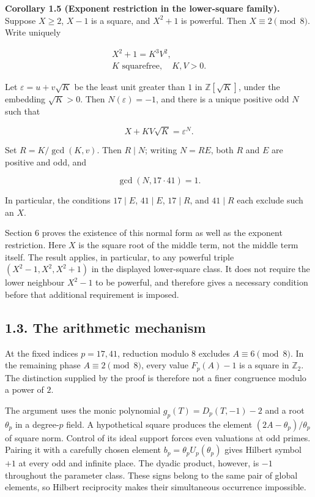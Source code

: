 \documentclass[11pt,a4paper]{article}
\begin{document}
\protect{}\label{cor-source}
\textbf{Corollary 1.5 (Exponent restriction in the lower-square
family).} Suppose \(X\ge2\), \(X-1\) is a square, and \(X^2+1\) is
powerful. Then \(X\equiv2\pmod8\). Write uniquely

\[
\begin{gathered}
X^2+1=K^3V^2,\\
K\text{ squarefree},\quad K,V>0.
\end{gathered}
\tag{1.7}
\]

Let \(\varepsilon=u+v\sqrt K\) be the least unit greater than \(1\) in
\(\mathbb Z[\sqrt K]\), under the embedding \(\sqrt K>0\). Then
\(N(\varepsilon)=-1\), and there is a unique positive odd \(N\) such
that

\[
X+KV\sqrt K=\varepsilon^N.
\tag{1.8}
\]

Set \(R=K/\gcd(K,v)\). Then \(R\mid N\); writing \(N=RE\), both \(R\)
and \(E\) are positive and odd, and

\[
\gcd(N,17\cdot41)=1.
\tag{1.9}
\]

In particular, the conditions \(17\mid E\), \(41\mid E\), \(17\mid R\),
and \(41\mid R\) each exclude such an \(X\).

Section 6 proves the existence of this normal form as well as the
exponent restriction. Here \(X\) is the square root of the middle term,
not the middle term itself. The result applies, in particular, to any
powerful triple \((X^2-1,X^2,X^2+1)\) in the displayed lower-square
class. It does not require the lower neighbour \(X^2-1\) to be powerful,
and therefore gives a necessary condition before that additional
requirement is imposed.

\subsection{1.3. The arithmetic mechanism}\label{strategy}

At the fixed indices \(p=17,41\), reduction modulo \(8\) excludes
\(A\equiv6\pmod8\). In the remaining phase \(A\equiv2\pmod8\), every
value \(F_p(A)-1\) is a square in \(\mathbb Z_2\). The distinction
supplied by the proof is therefore not a finer congruence modulo a power
of \(2\).

The argument uses the monic polynomial \(g_p(T)=D_p(T,-1)-2\) and a root
\(\theta_p\) in a degree-\(p\) field. A hypothetical square produces the
element \((2A-\theta_p)/\theta_p\) of square norm. Control of its ideal
support forces even valuations at odd primes. Pairing it with a
carefully chosen element \(b_p=\theta_pU_p(\theta_p)\) gives Hilbert
symbol \(+1\) at every odd and infinite place. The dyadic product,
however, is \(-1\) throughout the parameter class. These signs belong to
the same pair of global elements, so Hilbert reciprocity makes their
simultaneous occurrence impossible.
\end{document}
